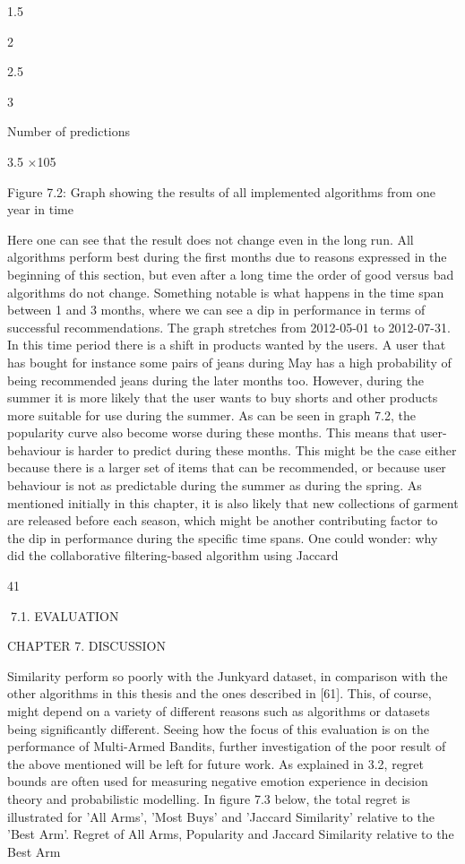 1.5

2

2.5

3

Number of predictions

3.5
×105

Figure 7.2: Graph showing the results of all implemented algorithms from one year in time

Here one can see that the result does not change even in the long run. All algorithms
perform best during the first months due to reasons expressed in the beginning of this
section, but even after a long time the order of good versus bad algorithms do not change.
Something notable is what happens in the time span between 1 and 3 months, where
we can see a dip in performance in terms of successful recommendations. The graph
stretches from 2012-05-01 to 2012-07-31. In this time period there is a shift in products
wanted by the users. A user that has bought for instance some pairs of jeans during
May has a high probability of being recommended jeans during the later months too.
However, during the summer it is more likely that the user wants to buy shorts and other
products more suitable for use during the summer. As can be seen in graph 7.2, the popularity curve also become worse during these months. This means that user-behaviour
is harder to predict during these months. This might be the case either because there is
a larger set of items that can be recommended, or because user behaviour is not as predictable during the summer as during the spring. As mentioned initially in this chapter,
it is also likely that new collections of garment are released before each season, which
might be another contributing factor to the dip in performance during the specific time
spans.
One could wonder: why did the collaborative filtering-based algorithm using Jaccard

41

7.1. EVALUATION

CHAPTER 7. DISCUSSION

Similarity perform so poorly with the Junkyard dataset, in comparison with the other
algorithms in this thesis and the ones described in [61]. This, of course, might depend on
a variety of different reasons such as algorithms or datasets being significantly different.
Seeing how the focus of this evaluation is on the performance of Multi-Armed Bandits,
further investigation of the poor result of the above mentioned will be left for future work.
As explained in 3.2, regret bounds are often used for measuring negative emotion experience in decision theory and probabilistic modelling. In figure 7.3 below, the total regret
is illustrated for ’All Arms’, ’Most Buys’ and ’Jaccard Similarity’ relative to the ’Best
Arm’.
Regret of All Arms, Popularity and Jaccard Similarity relative to the Best Arm


